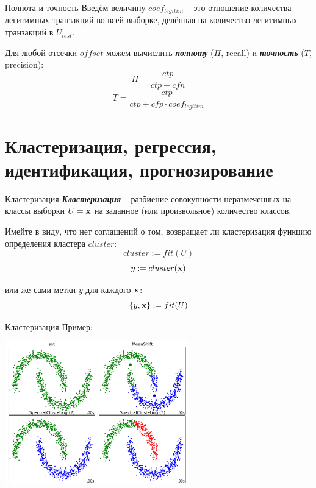 \documentclass{beamer}
\newcommand{\termdef}[1]{\textbf{\textit{#1}}}
\begin{document}
	\begin{frame}{Полнота и точность}
	Введём величину $coef_{legitim}$ -- это отношение количества легитимных транзакций во всей выборке, 
	делённая на количество легитимных транзакций в  $U_{test}$.
	
	Для любой отсечки $offset$ можем вычислить \termdef{полноту} ($\Pi$, recall) и \termdef{точность} ($T$, precision):
		\begin{equation}\label{eq:recall_by_counts}
		\Pi = \frac{ctp}{ctp + cfn}
		\end{equation}
		\begin{equation}\label{eq:presicionl_by_counts}
		T = \frac{ctp}{ctp + cfp \cdot coef_{legitim}}
		\end{equation}
	\end{frame}

	

   \section{Кластеризация, регрессия, идентификация, прогнозирование}\label{section:all_of_them}	

   \begin{frame}{Кластеризация}
   \termdef{Кластеризация} -- разбиение совокупности неразмеченных на классы выборки $U = {\bold x}$ на заданное (или произвольное) количество классов. 
   
   Имейте в виду, что нет соглашений о том, возвращает ли кластеризация функцию определения кластера $cluster$:
  \begin{equation}
  cluster := fit(U) 
  \end{equation}
  \begin{equation}
  y := cluster(\bold x) 
  \end{equation}
   
   или же сами метки $y$ для каждого $\bold x$:
   \begin{equation}
   \{ y, \bold x \} := fit(U) 
   \end{equation}
   \end{frame}

	\begin{frame}{Кластеризация}
	Пример:
	\begin{center}
	\includegraphics[width=8cm]{../pic/clustering_example_1.png}
	\end{center}
	\end{frame}
   
\end{document}

